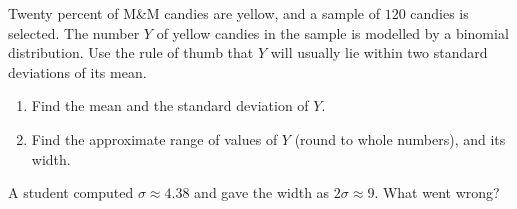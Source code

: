Twenty percent of M\&M candies are yellow, and a sample of $120$ candies is selected. The number $Y$ of yellow candies in the sample is modelled by a binomial distribution. Use the rule of thumb that $Y$ will usually lie within two standard deviations of its mean.
\begin{enumerate}
\item[(a)] Find the mean and the standard deviation of $Y$.
\item[(b)] Find the approximate range of values of $Y$ (round to whole numbers), and its width.
\end{enumerate}
A student computed $\sigma\approx4.38$ and gave the width as $2\sigma\approx9$. What went wrong?
